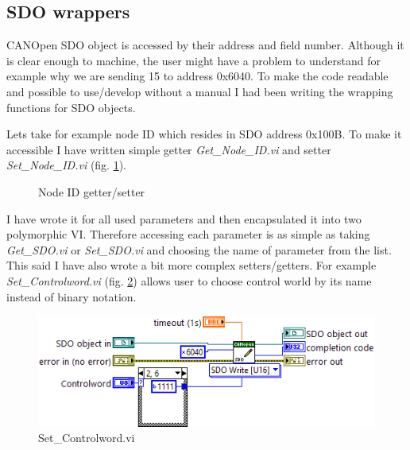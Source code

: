 \subsection{SDO wrappers}\label{SDO_wrappers}
CANOpen SDO object is accessed by their address and field number. Although it is clear enough to machine, the user might have a problem to understand for example why we are sending 15 to address 0x6040. To make the code readable and possible to use/develop without a manual I had been writing the wrapping functions for SDO objects.

Lets take for example node ID which resides in SDO address 0x100B. To make it accessible I have written simple getter \textit{Get\_Node\_ID.vi} and setter \textit{Set\_Node\_ID.vi} (fig. \ref{vi:set_get_nodeid}).
\begin{figure}[h]
    \centering
    \caption{Node ID getter/setter}
    \label{vi:set_get_nodeid}
\end{figure}
I have wrote it for all used parameters and then encapsulated it into two polymorphic VI. Therefore accessing each parameter is as simple as taking \textit{Get\_SDO.vi} or \textit{Set\_SDO.vi} and choosing the name of parameter from the list.%
This said I have also wrote a bit more complex setters/getters. For example \textit{Set\_Controlword.vi} (fig. \ref{vi:Set_Controlword}) allows user to choose control world by its name instead of binary notation.
\begin{figure}[H]
    \centering
    \includegraphics[scale=\visc,max width=\textwidth]{figures/Set_Controlwordd}
    \caption{Set\_Controlword.vi}
    \label{vi:Set_Controlword}
\end{figure}
